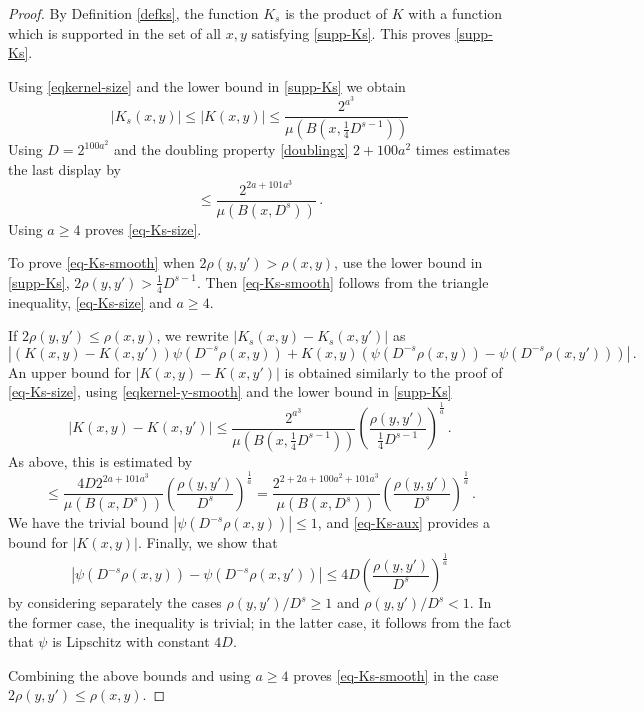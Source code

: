 \begin{proof}
    \leanok
    By Definition \eqref{defks}, the function $K_s$ is the product of
    $K$ with a function which is supported in the set of all
    $x,y$ satisfying \eqref{supp-Ks}. This proves
    \eqref{supp-Ks}.

    Using \eqref{eqkernel-size} and the lower bound in \eqref{supp-Ks}
    we obtain
    \begin{equation}
        \label{eqkernel-size-Ks}
        |K_s(x,y)|\le |K(x,y)|\le \frac{2^{a^3}}{\mu(B(x,\frac 14 D^{s-1}))}
    \end{equation}
    Using $D=2^{100a^2}$
    and the doubling property \eqref{doublingx} $2 +100a^2$ times estimates
    the last display by
    \begin{equation}
        \label{eq-Ks-aux}
        \le \frac{2^{2a+101a^3}}{\mu(B(x, D^{s}))}\, .
    \end{equation}
    Using $a\ge 4$ proves \eqref{eq-Ks-size}.

    To prove \eqref{eq-Ks-smooth} when $2\rho(y,y') > \rho(x,y)$, use the lower bound in
    \eqref{supp-Ks}, $2\rho(y,y') > \frac{1}{4}D^{s-1}$. Then \eqref{eq-Ks-smooth} follows from
    the triangle inequality, \eqref{eq-Ks-size} and $a \ge 4$.

    If $2\rho(y,y') \le \rho(x,y)$, we rewrite $|K_s(x,y)-K_s(x, y')|$ as
    \begin{equation}
        |(K(x,y)-K(x,y')) \psi(D^{-s}\rho(x,y)) +
        K(x,y)(\psi(D^{-s}\rho(x,y))-\psi(D^{-s}\rho(x,y')))|\,.
    \end{equation}
    An upper bound for $|K(x,y)-K(x, y')|$ is obtained similarly to the proof of
    \eqref{eq-Ks-size}, using \eqref{eqkernel-y-smooth} and the lower bound in \eqref{supp-Ks}
    \begin{equation}
        |K(x,y)-K(x, y')|\le \frac{2^{a^3}}{\mu(B(x, \frac 14 D^{s-1}))}
        \left(\frac{ \rho(y,y')}{\frac 14 D^{s-1}}\right)^{\frac 1a}\,.
    \end{equation}
    As above, this is estimated by
    \begin{equation}
       \le \frac{4D 2^{2a+101a^3}}{\mu(B(x, D^{s}))}
        \left(\frac{ \rho(y,y')}{D^{s}}\right)^{\frac 1a}
         = \frac{2^{2+2a+100a^2+101a^3}}{\mu(B(x, D^{s}))}
        \left(\frac{ \rho(y,y')}{D^{s}}\right)^{\frac 1a}\,.
    \end{equation}
    We have the trivial bound $|\psi(D^{-s}\rho(x,y))| \leq 1$, and \eqref{eq-Ks-aux}
    provides a bound for $|K(x,y)|$. Finally, we show that
    \begin{equation}
        |\psi(D^{-s}\rho(x,y))-\psi(D^{-s}\rho(x,y'))|\le
        4D \left(\frac{\rho(y, y')}{D ^ s}\right)^{\frac 1a}
    \end{equation}
    by considering separately the cases $\rho(y,y')/D^s \ge 1$ and $\rho(y,y')/D^s < 1$. In the
    former case, the inequality is trivial; in the latter case, it follows from the
    fact that $\psi$ is Lipschitz with constant $4D$.

    Combining the above bounds and using $a\ge 4$ proves \eqref{eq-Ks-smooth} in the case
    $2\rho(y,y') \le \rho(x,y)$.
\end{proof}


